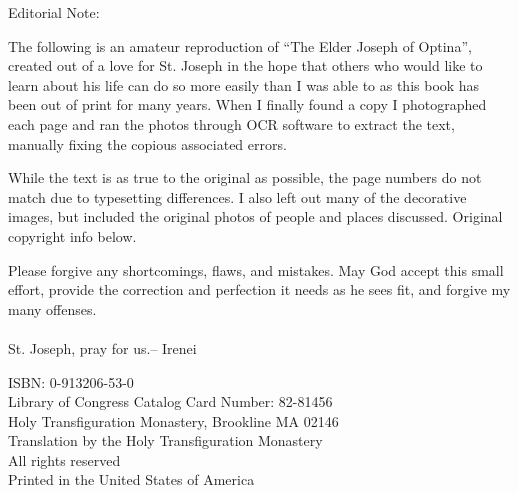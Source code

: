 \begin{adjustwidth}{.5cm}{.5cm}\itshape
	
	Editorial Note: 

    The following is an amateur reproduction of ``The Elder Joseph of Optina'', created out of a love for St. Joseph
    in the hope that others who would like to learn about his life can do so more easily than I was able to as this book has been 
    out of print for many years. When I finally found a copy I photographed each page and ran the photos
    through OCR software to extract the text, manually fixing the copious associated errors.

	While the text is as true to the original as possible, the page numbers do not match due to typesetting
	differences. I also left out many of the decorative images, 
	but included the original photos of people and places discussed. Original copyright info below.
	
	Please forgive any shortcomings, flaws, and mistakes. May God accept this small effort, 
	provide the correction and perfection it needs as he sees fit, and forgive my many offenses.\\
    \\
    St. Joseph, pray for us.\hspace*{\fill}-- Irenei\hspace*{1cm}
	
\end{adjustwidth}
\vspace*{\fill}
\begin{center}
	
	ISBN: 0-913206-53-0\\
	Library of Congress Catalog Card Number: 82-81456\\
	Holy Transfiguration Monastery, Brookline MA 02146\\
	Translation  by the Holy Transfiguration Monastery\\
	All rights reserved\\
	Printed in the United States of America
\end{center}
\clearpage
